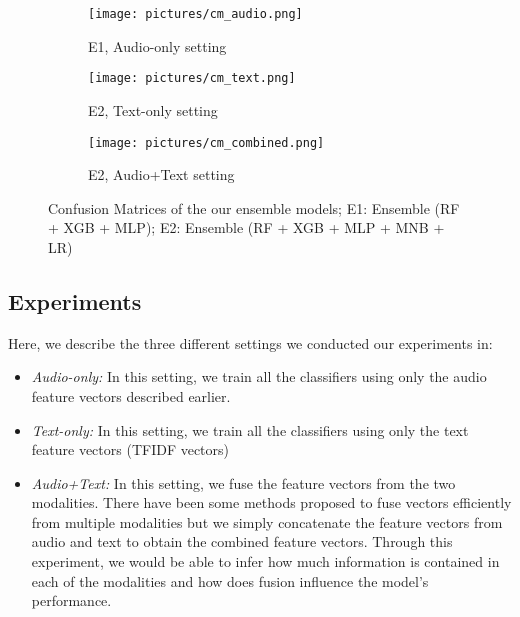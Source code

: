 \documentclass[conference]{IEEEtran}
\begin{document}
\begin{figure}
    \centering
    \begin{subfigure}[ht]{\linewidth}
        \centering
    	\texttt{[image: pictures/cm\_audio.png]}
    	\caption{E1, Audio-only setting}
    	\label{fig:cm_aud}
    \end{subfigure}

    \begin{subfigure}[ht]{\linewidth}
        \centering
    	\texttt{[image: pictures/cm\_text.png]}
    	\caption{E2, Text-only setting}
    	\label{fig:cm_tex}
    \end{subfigure}

    \begin{subfigure}[ht]{\linewidth}
        \centering
    	\texttt{[image: pictures/cm\_combined.png]}
    	\caption{E2, Audio+Text setting}
    	\label{fig:cm_com}
    \end{subfigure}
    \caption{Confusion Matrices of the our ensemble models; E1: Ensemble (RF + XGB + MLP); E2: Ensemble (RF + XGB + MLP + MNB + LR)}
    \label{fig:cm}
\end{figure}

\subsection{Experiments}
Here, we describe the three different settings we conducted our experiments in:
\begin{itemize}
    \item \textit{Audio-only:} In this setting, we train all the classifiers using only the audio feature vectors described earlier.
    \item \textit{Text-only:} In this setting, we train all the classifiers using only the text feature vectors (TFIDF vectors)
    \item \textit{Audio+Text:} In this setting, we fuse the feature vectors from the two modalities. There have been some methods proposed to fuse vectors efficiently from multiple modalities but we simply concatenate the feature vectors from audio and text to obtain the combined feature vectors. Through this experiment, we would be able to infer how much information is contained in each of the modalities and how does fusion influence the model's performance.
\end{itemize}
\end{document}
